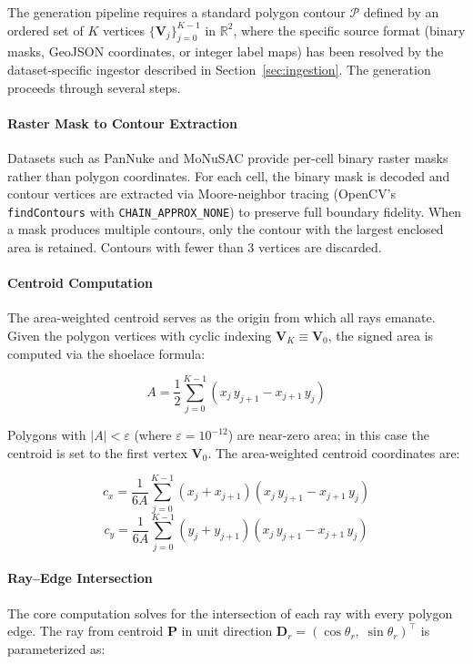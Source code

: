 The generation pipeline requires a standard polygon contour $\mathcal{P}$ defined by an ordered set of $K$ vertices $\{\mathbf{V}_j\}_{j=0}^{K-1}$ in $\mathbb{R}^2$, where the specific source format (binary masks, GeoJSON coordinates, or integer label maps) has been resolved by the dataset-specific ingestor described in Section~\ref{sec:ingestion}. The generation proceeds through several steps.

\paragraph{Raster Mask to Contour Extraction}
Datasets such as PanNuke and MoNuSAC provide per-cell binary raster masks rather than polygon coordinates. For each cell, the binary mask is decoded and contour vertices are extracted via Moore-neighbor tracing (OpenCV's \texttt{findContours} with \texttt{CHAIN\_APPROX\_NONE}) to preserve full boundary fidelity. When a mask produces multiple contours, only the contour with the largest enclosed area is retained. Contours with fewer than 3 vertices are discarded.

\paragraph{Centroid Computation}
The area-weighted centroid serves as the origin from which all rays emanate. Given the polygon vertices with cyclic indexing $\mathbf{V}_K \equiv \mathbf{V}_0$, the signed area is computed via the shoelace formula:

\begin{equation}
    A = \frac{1}{2} \sum_{j=0}^{K-1} \left( x_j \, y_{j+1} - x_{j+1} \, y_j \right)
\end{equation}

Polygons with $|A| < \varepsilon$ (where $\varepsilon = 10^{-12}$) are near-zero area; in this case the centroid is set to the first vertex $\mathbf{V}_0$. The area-weighted centroid coordinates are:

\begin{equation}
    c_x = \frac{1}{6A} \sum_{j=0}^{K-1} (x_j + x_{j+1})\left( x_j \, y_{j+1} - x_{j+1} \, y_j \right)
\end{equation}
\begin{equation}
    c_y = \frac{1}{6A} \sum_{j=0}^{K-1} (y_j + y_{j+1})\left( x_j \, y_{j+1} - x_{j+1} \, y_j \right)
\end{equation}

\paragraph{Ray--Edge Intersection}
The core computation solves for the intersection of each ray with every polygon edge. The ray from centroid $\mathbf{P}$ in unit direction $\mathbf{D}_r = (\cos\theta_r,\; \sin\theta_r)^\top$ is parameterized as:

